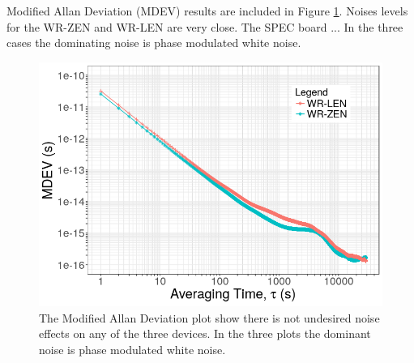 Modified Allan Deviation (MDEV) results are included in Figure 
\ref{fig:mdev_exp1}. Noises levels for the WR-ZEN and WR-LEN are very close. 
The SPEC board ... In the three cases the dominating noise is phase modulated 
white noise.

\begin{figure}
    \centering
    \includegraphics[width=0.7\linewidth]{img/mdev_exp1}
    \caption[MDEV for the WR devices comparison.]{The Modified Allan Deviation 
        plot show there is not undesired noise effects on any of the three 
        devices. 
        In the three plots the dominant noise is phase modulated white noise.}
    \label{fig:mdev_exp1}
\end{figure}



